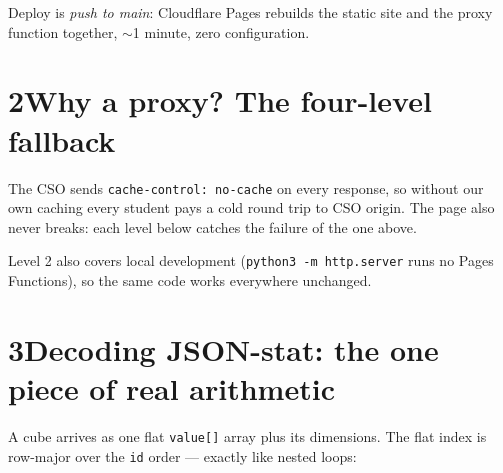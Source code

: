 \documentclass[11pt,a4paper]{article}
\begin{document}
Deploy is \emph{push to main}: Cloudflare Pages rebuilds the static site and the
proxy function together, $\sim$1 minute, zero configuration.

\section*{2\quad Why a proxy? The four-level fallback}

The CSO sends \texttt{cache-control: no-cache} on every response, so without our
own caching every student pays a cold round trip to CSO origin. The page also
never breaks: each level below catches the failure of the one above.

\begin{center}
\end{center}

Level 2 also covers local development (\texttt{python3 -m http.server} runs no
Pages Functions), so the same code works everywhere unchanged.

\section*{3\quad Decoding JSON-stat: the one piece of real arithmetic}

A cube arrives as one flat \texttt{value[]} array plus its dimensions. The flat
index is row-major over the \texttt{id} order --- exactly like nested loops:
\end{document}

